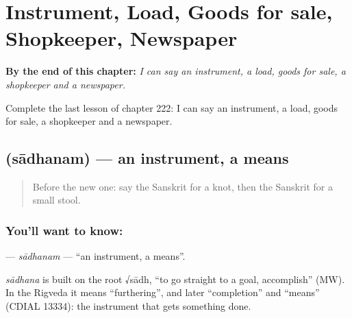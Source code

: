 
\chapter{Instrument, Load, Goods for sale, Shopkeeper, Newspaper}
\label{ch:sa-instrument-load-goods-for-sale-shopkeeper-newspaper}

\begin{chapteropening}
\textbf{By the end of this chapter:} \emph{I can say an instrument, a load, goods for sale, a shopkeeper and a newspaper.}

Complete the last lesson of chapter 222: I can say an instrument, a load, goods for sale, a shopkeeper and a newspaper.
\end{chapteropening}

\section[\texorpdfstring{\sk{साधनम्} (sādhanam)}{साधनम् (sādhanam)}]{ (sādhanam) — an instrument, a means}

\label{lesson:SA-C222-sadhanam}



\begin{quote}
Before the new one: say the Sanskrit for a knot, then the Sanskrit for a small stool.
\end{quote}

\subsection*{You'll want to know: }
\textbf{} — \emph{sādhanam} — \textquotedblleft{}an instrument, a means\textquotedblright{}.

\begin{cousinweb}
\emph{sādhana} is built on the root √sādh, \textquotedblleft{}to go straight to a goal, accomplish\textquotedblright{} (MW). In the Rigveda it means \textquotedblleft{}furthering\textquotedblright{}, and later \textquotedblleft{}completion\textquotedblright{} and \textquotedblleft{}means\textquotedblright{} (CDIAL 13334): the instrument that gets something done.
\end{cousinweb}

